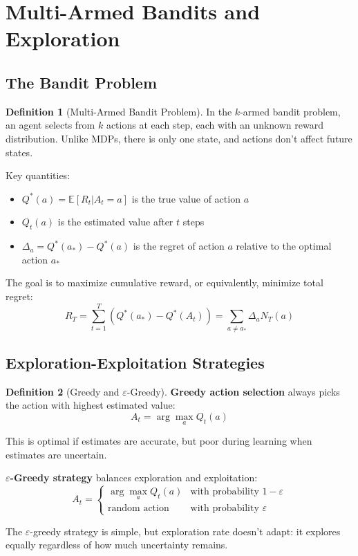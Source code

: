 \documentclass[12pt,a4paper]{article}
\theoremstyle{definition}
\newtheorem{definition}{Definition}[section]
\begin{document}
\section{Multi-Armed Bandits and Exploration}

\subsection{The Bandit Problem}

\begin{definition}[Multi-Armed Bandit Problem]
In the $k$-armed bandit problem, an agent selects from $k$ actions at each step, each with an unknown reward distribution. Unlike MDPs, there is only one state, and actions don't affect future states.

Key quantities:
\begin{itemize}
    \item $Q^*(a) = \mathbb{E}[R_t | A_t = a]$ is the true value of action $a$
    \item $Q_t(a)$ is the estimated value after $t$ steps
    \item $\Delta_a = Q^*(a_*) - Q^*(a)$ is the regret of action $a$ relative to the optimal action $a_*$
\end{itemize}

The goal is to maximize cumulative reward, or equivalently, minimize total regret:
\[
R_T = \sum_{t=1}^T (Q^*(a_*) - Q^*(A_t)) = \sum_{a \neq a_*} \Delta_a N_T(a)
\]
\end{definition}

\subsection{Exploration-Exploitation Strategies}

\begin{definition}[Greedy and $\varepsilon$-Greedy]
\textbf{Greedy action selection} always picks the action with highest estimated value:
\[
A_t = \arg\max_a Q_t(a)
\]

This is optimal if estimates are accurate, but poor during learning when estimates are uncertain.

\textbf{$\varepsilon$-Greedy strategy} balances exploration and exploitation:
\[
A_t = \begin{cases}
\arg\max_a Q_t(a) & \text{with probability } 1-\varepsilon \\
\text{random action} & \text{with probability } \varepsilon
\end{cases}
\]

The $\varepsilon$-greedy strategy is simple, but exploration rate doesn't adapt: it explores equally regardless of how much uncertainty remains.
\end{definition}
\end{document}

